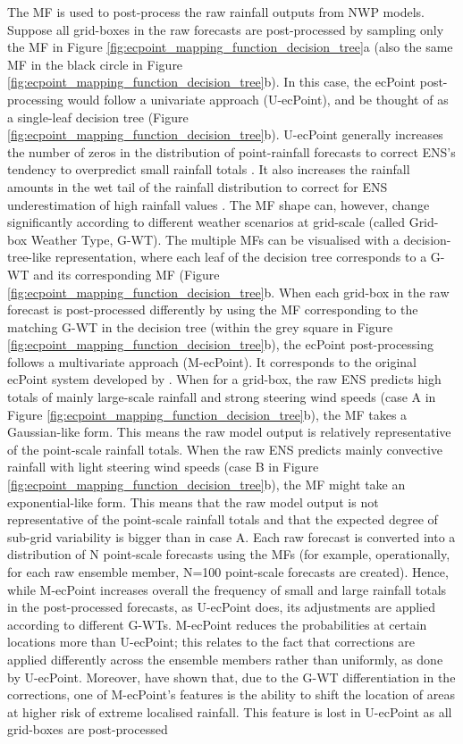 The  MF is used to post-process the raw rainfall outputs from NWP models. Suppose all grid-boxes in the raw forecasts are post-processed by sampling only the MF in Figure \ref{fig:ecpoint_mapping_function_decision_tree}a (also the same MF in the black circle in Figure \ref{fig:ecpoint_mapping_function_decision_tree}b). In this case, the ecPoint post-processing would follow a univariate approach (U-ecPoint), and be thought of as a single-leaf decision tree (Figure \ref{fig:ecpoint_mapping_function_decision_tree}b). U-ecPoint generally increases the number of zeros in the distribution of point-rainfall forecasts to correct ENS's tendency to overpredict small rainfall totals \citep{Haiden_2023}. It also increases the rainfall amounts in the wet tail of the rainfall distribution to correct for ENS underestimation of high rainfall values \citep{Haiden_2023}. The MF shape can, however, change significantly according to different weather scenarios at grid-scale (called Grid-box Weather Type, G-WT). The multiple MFs can be visualised with a decision-tree-like representation, where each leaf of the decision tree corresponds to a G-WT and its corresponding MF (Figure \ref{fig:ecpoint_mapping_function_decision_tree}b. When each grid-box in the raw forecast is post-processed differently by using the MF corresponding to the matching G-WT in the decision tree (within the grey square in Figure \ref{fig:ecpoint_mapping_function_decision_tree}b), the ecPoint post-processing follows a multivariate approach (M-ecPoint). It corresponds to the original ecPoint system developed by \citet{Hewson_2021}. When for a grid-box, the raw ENS predicts high totals of mainly large-scale rainfall and strong steering wind speeds (case A in Figure \ref{fig:ecpoint_mapping_function_decision_tree}b), the MF takes a Gaussian-like form. This means the raw model output is relatively representative of the point-scale rainfall totals. When the raw ENS predicts mainly convective rainfall with light steering wind speeds (case B in Figure \ref{fig:ecpoint_mapping_function_decision_tree}b), the MF might take an exponential-like form. This means that the raw model output is not representative of the point-scale rainfall totals and that the expected degree of sub-grid variability is bigger than in case A. Each raw forecast is converted into a distribution of N point-scale forecasts using the MFs (for example, operationally, for each raw ensemble member, N=100 point-scale forecasts are created). Hence, while M-ecPoint increases overall the frequency of small and large rainfall totals in the post-processed forecasts, as U-ecPoint does, its adjustments are applied according to different G-WTs. M-ecPoint reduces the probabilities at certain locations more than U-ecPoint; this relates to the fact that corrections are applied differently across the ensemble members rather than uniformly, as done by U-ecPoint. Moreover, \citet{Hewson_2021} have shown that, due to the G-WT differentiation in the corrections, one of M-ecPoint's features is the ability to shift the location of areas at higher risk of extreme localised rainfall. This feature is lost in U-ecPoint as all grid-boxes are post-processed 